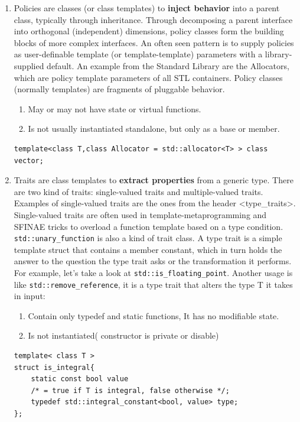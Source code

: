 \documentclass[a4paper,11pt,twoside]{book}
\begin{document}
\begin{itemize}
\begin{enumerate}
    \item Policies are classes (or class templates) to \textbf{inject behavior} into a parent class, typically through inheritance. Through decomposing a parent interface into orthogonal (independent) dimensions, policy classes form the building blocks of more complex interfaces. An often seen pattern is to supply policies as user-definable template (or template-template) parameters with a library-supplied default. An example from the Standard Library are the Allocators, which are policy template parameters of all STL containers. Policy classes (normally templates) are fragments of pluggable behavior.
        \begin{enumerate}
            \item May or may not have state or virtual functions.
            \item Is not usually instantiated standalone, but only as a base or member. 
        \end{enumerate}

\begin{lstlisting}[numbers=none]
template<class T,class Allocator = std::allocator<T> > class vector;
\end{lstlisting}
	
	\item Traits are class templates to \textbf{extract properties} from a generic type. There are two kind of traits: single-valued traits and multiple-valued traits. Examples of single-valued traits are the ones from the header <type\_traits>. Single-valued traits are often used in template-metaprogramming and SFINAE tricks to overload a function template based on a type condition. \texttt{std::unary\_function} is also a kind of trait class.  A type trait is a simple template struct that contains a member constant, which in turn holds the answer to the question the type trait asks or the transformation it performs. For example, let's take a look at \texttt{std::is\_floating\_point}. Another usage is like \texttt{std::remove\_reference}, it is a type trait that alters the type T it takes in input:

		\begin{enumerate}
			\item Contain only typedef and static functions, It has no modifiable state.
			\item Is not instantiated( constructor is private or disable)
		\end{enumerate}
	\begin{lstlisting}[numbers=none]
template< class T >
struct is_integral{
	static const bool value
	/* = true if T is integral, false otherwise */;
	typedef std::integral_constant<bool, value> type;
};
	

\end{lstlisting}
\end{enumerate}
\end{itemize}
\end{document}
